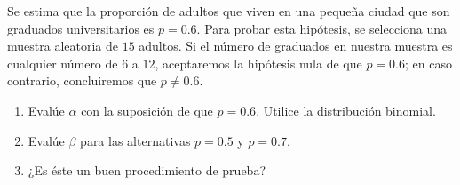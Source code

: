 \begin{enunciado}
 Se estima que la proporci\'on de adultos que viven en una peque\~na ciudad que son graduados universitarios es $p = 0.6$. Para probar esta hip\'otesis, se selecciona una muestra aleatoria de $15$ adultos. Si el n\'umero de graduados en nuestra muestra es cualquier n\'umero de $6$ a $12$, aceptaremos la hip\'otesis nula de que $p = 0.6$; en caso contrario, concluiremos que $p \neq 0.6$.
 \begin{enumerate}
  \item Eval\'ue $\alpha$ con la suposici\'on de que $p = 0.6$. Utilice la distribuci\'on binomial.
  
  \item Eval\'ue $\beta$ para las alternativas $p = 0.5$ y $p = 0.7$.
  
  \item ¿Es \'este un buen procedimiento de prueba?
 \end{enumerate}
\end{enunciado}

